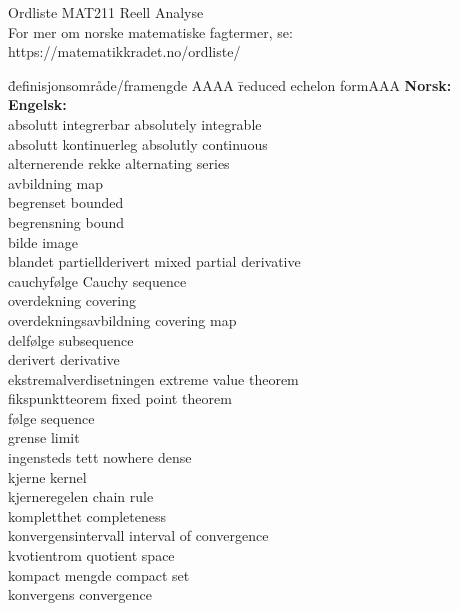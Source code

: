 \documentclass[11pt]{amsart}
\begin{document}

\vskip 3cm
\begin{center}{{\huge {Ordliste MAT211 Reell Analyse}}} \\
  \vskip 3mm
  For mer om norske matematiske fagtermer, se: \\
  https://matematikkradet.no/ordliste/
\end{center}


\vskip 5mm
\noindent{\bf }


\begin{tabbing}
  \= definisjonsområde/framengde AAAA \=  reduced echelon formAAA  \kill
  \>  {\bf Norsk:}  \>  {\bf Engelsk:} \\
\> absolutt integrerbar \> absolutely integrable \\
\> absolutt kontinuerleg \> absolutly continuous \\
\> alternerende rekke  \> alternating series  \\
\> avbildning \> map \\
\> begrenset\> bounded  \\
\> begrensning \> bound  \\
\> bilde \> image \\
\> blandet partiellderivert \> mixed partial derivative   \\
\> cauchyfølge \> Cauchy sequence  \\
\> overdekning \> covering  \\
\> overdekningsavbildning\> covering map  \\
\> delfølge \> subsequence  \\
\> derivert \> derivative  \\
\> ekstremalverdisetningen\> extreme value theorem \\
\> fikspunktteorem \> fixed point theorem  \\
\> følge  \> sequence  \\
\> grense \> limit  \\
\> ingensteds tett \> nowhere dense  \\
\> kjerne \> kernel  \\
\> kjerneregelen \> chain rule \\
\> kompletthet \> completeness  \\
\> konvergensintervall \> interval of convergence \\
\> kvotientrom \> quotient space  \\
\> kompact mengde \> compact set \\
\> konvergens \> convergence  \\

\end{tabbing}
\end{document}
